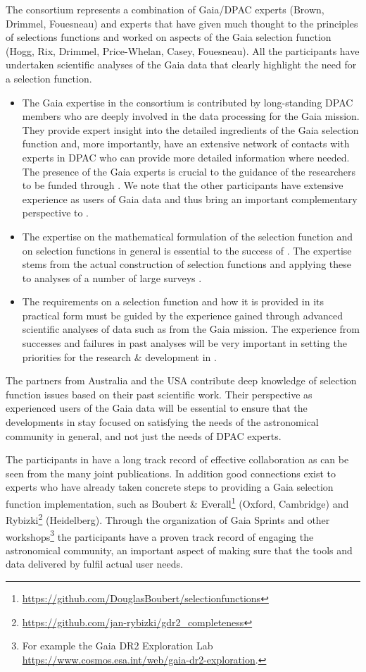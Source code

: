 The consortium represents a combination of Gaia/DPAC experts (Brown, Drimmel, Fouesneau) and experts that have given much thought to the principles of selections functions and worked on aspects of the Gaia selection function (Hogg, Rix, Drimmel, Price-Whelan, Casey, Fouesneau). All the participants have undertaken scientific analyses of the Gaia data that clearly highlight the need for a selection function. 
\begin{itemize}
    \item The Gaia expertise in the consortium is contributed by long-standing DPAC members who are deeply involved in the data processing for the Gaia mission. They provide expert insight into the detailed ingredients of the Gaia selection function and, more importantly, have an extensive network of contacts with experts in DPAC who can provide more detailed information where needed. The presence of the Gaia experts is crucial to the guidance of the researchers to be funded through {\acro}. We note that the other participants have extensive experience as users of Gaia data and thus bring an important complementary perspective to {\acro}.
    \item The expertise on the mathematical formulation of the selection function and on selection functions in general is essential to the success of {\acro}. The expertise stems from the actual construction of selection functions and applying these to analyses of a number of large surveys .
    \item The requirements on a selection function and how it is provided in its practical form must be guided by the experience gained through advanced scientific analyses of data such as from the Gaia mission. The experience from successes and failures in past analyses will be very important in setting the priorities for the research \& development in {\acro}.
\end{itemize}

The partners from Australia and the USA contribute deep knowledge of selection function issues based on their past scientific work. Their perspective as experienced users of the Gaia data will be essential to ensure that the developments in {\acro} stay focused on satisfying the needs of the astronomical community in general, and not just the needs of DPAC experts.

The participants in {\acro} have a long track record of effective collaboration as can be seen from the many joint publications. In addition good connections exist to experts who have already taken concrete steps to providing a Gaia selection function implementation, such as Boubert \& Everall\footnote{\url{https://github.com/DouglasBoubert/selectionfunctions}} (Oxford, Cambridge) and Rybizki\footnote{\url{https://github.com/jan-rybizki/gdr2_completeness}} (Heidelberg). Through the organization of Gaia Sprints and other workshops\footnote{For example the Gaia DR2 Exploration Lab \url{https://www.cosmos.esa.int/web/gaia-dr2-exploration}.} the participants have a proven track record of engaging the astronomical community, an important aspect of making sure that the tools and data delivered by {\acro} fulfil actual user needs.

